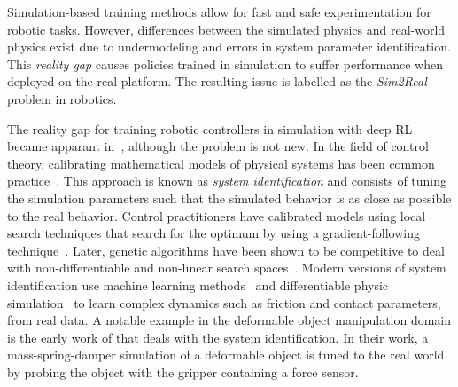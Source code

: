 \documentclass[\home/main.tex]{subfiles}
\begin{document}
Simulation-based training methods allow for fast and safe experimentation for robotic tasks. However, differences between the simulated physics and real-world physics exist due to undermodeling and errors in system parameter identification. This \emph{reality gap} causes policies trained in simulation to suffer performance when deployed on the real platform. The resulting issue is labelled as the \emph{Sim2Real} problem in robotics.

The reality gap for training robotic controllers in simulation with deep RL became apparant in~\autocite{Zhang2015}, although the problem is not new. In the field of control theory, calibrating mathematical models of physical systems has been common practice~\autocite{ljung1983theory}. This approach is known as \emph{system identification} and consists of tuning the simulation parameters such that the simulated behavior is as close as possible to the real behavior. Control practitioners have calibrated models using local search techniques that search for the optimum by using a gradient-following technique~\autocite{ljung1983theory}. Later, genetic algorithms have been shown to be competitive to deal with non-differentiable and non-linear search spaces~\autocite{Kristinsson1992}. Modern versions of system identification use machine learning methods~\autocite{chebotar2019closing} and differentiable physic simulation~\autocite{heiden2021neuralsim} to learn complex dynamics such as friction and contact parameters, from real data. A notable example in the deformable object manipulation domain is the early work of \textcite{Howard2000} that deals with the system identification. In their work, a mass-spring-damper simulation of a deformable object is tuned to the real world by probing the object with the gripper containing a force sensor.
\end{document}
